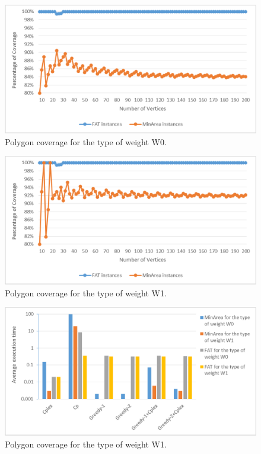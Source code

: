 \documentclass[runningheads,a4paper]{elsarticle}
\begin{document}
    \begin{figure}
    	\centering
    	\includegraphics[width=\textwidth]{grafikon1.eps}
    	\caption{Polygon coverage for the type of weight W0.}
    	\label{fig:covw0}
    \end{figure}
    
    \begin{figure}
    	\centering
    	\includegraphics[width=\textwidth]{grafikon2.eps}
    	\caption{Polygon coverage for the type of weight W1.}
    	\label{fig:covw1}
    \end{figure}
    \begin{figure}
    	\centering
    	\includegraphics[width=\textwidth]{grafikon3.eps}
    	\caption{Polygon coverage for the type of weight W1.}
    	\label{fig:timealg}
    \end{figure}
    
\end{document}
